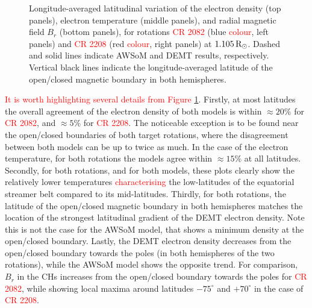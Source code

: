 \documentclass[namedreferences]{solarphysics}
\def\edit#1{\textcolor{Red}{#1}}
\newcommand{\mdeg}{^\circ}
\newcommand{\mrsun}{{\rm R_\odot}}
\begin{document}
\begin{article}
\begin{figure}[h!]
\begin{center}
\caption{Longitude-averaged latitudinal variation of the electron density ({top panels}), {electron temperature ({middle panels})}, and {radial magnetic field $B_r$ (bottom panels), for rotations} \edit{CR 2082} ({blue \edit{colour}, left panels}) and \edit{CR 2208} ({red \edit{colour}, right panels) at} $1.105\,\mrsun$. Dashed and solid lines indicate AWSoM and DEMT results, respectively. Vertical black lines indicate the longitude-averaged latitude of the open/closed magnetic boundary in both hemispheres.}
\label{perf_lat}
\end{center}
\end{figure}

\edit{It is worth highlighting several details from Figure \ref{perf_lat}}. Firstly, at most latitudes the overall agreement of the electron density of both models is within $\approx 20\%$ for \edit{CR 2082}, and $\approx 5\%$ for \edit{CR 2208}. The noticeable exception is to be found near the open/closed boundaries of both target rotations, where the disagreement between both models can be up to twice as much. In the case of the electron temperature, for both rotations the models agree within $\approx 15\%$ at all latitudes. Secondly, for both rotations, and for both models, these plots clearly show the relatively lower temperatures \edit{characterising} the low-latitudes of the equatorial streamer belt compared to its mid-latitudes. Thirdly, for both rotations, the latitude of the open/closed magnetic boundary in both hemispheres matches the location of the strongest latitudinal gradient of the DEMT electron density. Note this is not the case for the AWSoM model, that shows a minimum density at the open/closed boundary. {Lastly, the DEMT} electron density decreases from the open/closed boundary towards the poles (in both hemispheres of the two rotations), while the AWSoM model shows the opposite trend. {For comparison, {$B_r$ in the CHs increases} from the open/closed boundary towards the poles for \edit{CR 2082}, while showing local maxima around latitudes $-75\mdeg$ and $+70\mdeg$ in the case of \edit{CR 2208}.}


\end{article}
\end{document}
